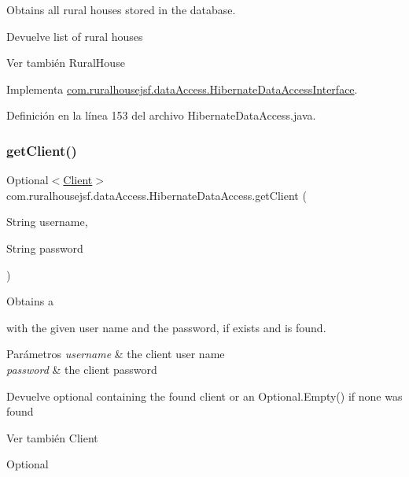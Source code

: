 Obtains all rural houses stored in the database.

\begin{DoxyReturn}{Devuelve}
list of rural houses
\end{DoxyReturn}
\begin{DoxySeeAlso}{Ver también}
Rural\+House 
\end{DoxySeeAlso}


Implementa \mbox{\hyperlink{interfacecom_1_1ruralhousejsf_1_1data_access_1_1_hibernate_data_access_interface_a1cdfce6d8d91e481887b364000fbf6d0}{com.\+ruralhousejsf.\+data\+Access.\+Hibernate\+Data\+Access\+Interface}}.



Definición en la línea 153 del archivo Hibernate\+Data\+Access.\+java.

\mbox{\label{classcom_1_1ruralhousejsf_1_1data_access_1_1_hibernate_data_access_a6df6a0502595b73be0f6d238743eeda5}} 
\subsubsection{\texorpdfstring{getClient()}{getClient()}}
{\footnotesize\ttfamily Optional$<$\mbox{\hyperlink{classcom_1_1ruralhousejsf_1_1domain_1_1_client}{Client}}$>$ com.\+ruralhousejsf.\+data\+Access.\+Hibernate\+Data\+Access.\+get\+Client (\begin{DoxyParamCaption}\item[{String}]{username,  }\item[{String}]{password }\end{DoxyParamCaption})}

Obtains a
\begin{DoxyCode}{0}
\end{DoxyCode}
 with the given user name and the password, if exists and is found.


\begin{DoxyParams}{Parámetros}
{\em username} & the client user name \\
\hline
{\em password} & the client password\\
\hline
\end{DoxyParams}
\begin{DoxyReturn}{Devuelve}
optional containing the found client or an {\ttfamily Optional.\+Empty()} if none was found
\end{DoxyReturn}
\begin{DoxySeeAlso}{Ver también}
Client 

Optional 
\end{DoxySeeAlso}


